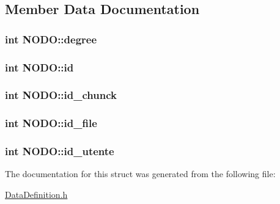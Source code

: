 \subsection{Member Data Documentation}
\hypertarget{structNODO_ac347f94dfc5042c7a35b5a2ae30796c3}{
\subsubsection[{degree}]{\setlength{\rightskip}{0pt plus 5cm}int N\-O\-D\-O\-::degree}}\label{structNODO_ac347f94dfc5042c7a35b5a2ae30796c3}
\hypertarget{structNODO_a363311f2eac0f019bb559decee9d283a}{
\subsubsection[{id}]{\setlength{\rightskip}{0pt plus 5cm}int N\-O\-D\-O\-::id}}\label{structNODO_a363311f2eac0f019bb559decee9d283a}
\hypertarget{structNODO_afff09f10bea60ea56ef2ee708a876017}{
\subsubsection[{id\-\_\-chunck}]{\setlength{\rightskip}{0pt plus 5cm}int N\-O\-D\-O\-::id\-\_\-chunck}}\label{structNODO_afff09f10bea60ea56ef2ee708a876017}
\hypertarget{structNODO_ad1f3355d97fd04e0d908dc196bbf07af}{
\subsubsection[{id\-\_\-file}]{\setlength{\rightskip}{0pt plus 5cm}int N\-O\-D\-O\-::id\-\_\-file}}\label{structNODO_ad1f3355d97fd04e0d908dc196bbf07af}
\hypertarget{structNODO_a3d58b6fffbdc9fa4dd781d6e5d775ce5}{
\subsubsection[{id\-\_\-utente}]{\setlength{\rightskip}{0pt plus 5cm}int N\-O\-D\-O\-::id\-\_\-utente}}\label{structNODO_a3d58b6fffbdc9fa4dd781d6e5d775ce5}


The documentation for this struct was generated from the following file\-:\begin{DoxyCompactItemize}
\item 
\hyperlink{DataDefinition_8h}{Data\-Definition.\-h}\end{DoxyCompactItemize}

